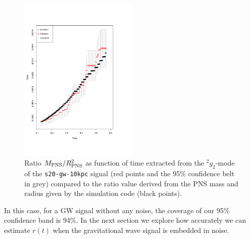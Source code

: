\begin{figure}
 \centering
 \includegraphics[width=0.5\textwidth,height=0.3\textheight]{plots/ratio}
 \caption{Ratio $M_{\rm PNS}/R_{\rm PNS}^2$ as function of time extracted from the $\mbox{}^2 g_2$-mode of the {\tt s20-gw-10kpc} signal (red points and the 95\% confidence belt in grey) compared to the ratio value derived from the PNS mass and radius given by the simulation code (black points).} \label{fig:ratio}
\end{figure}


In this case, for a GW signal without any noise, the coverage of our 95\% confidence band is 94\%.
In the next section we explore how accurately we can estimate $r(t)$ when the gravitational wave
signal is embedded in noise.
